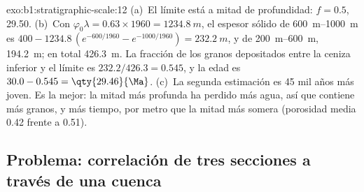 \begin{solution}{exo:b1:stratigraphic-scale:12}
(a)~El límite está a mitad de profundidad: $f = 0.5$, \qty{29.50}{\Ma}. (b)~Con
$\varphi_0\lambda = 0.63 \times 1960 = \qty{1234.8}{m}$, el espesor sólido de
\qtyrange{600}{1000}{m} es $400 - 1234.8\,(e^{-600/1960} - e^{-1000/1960}) =
\qty{232.2}{m}$, y de \qtyrange{200}{600}{m}, \qty{194.2}{m}; en total
\qty{426.3}{m}. La fracción de los granos depositados entre la ceniza inferior y el
límite es $232.2/426.3 = 0.545$, y la edad es $30.0 - 0.545 =
\qty{29.46}{\Ma}$. (c)~La segunda estimación es \num{45} mil años más joven.
Es la mejor: la mitad más profunda ha perdido más agua, así que contiene más granos, y más tiempo, por metro que la mitad más somera (porosidad media
\num{0.42} frente a \num{0.51}).
\end{solution}

\subsection*{Problema: correlación de tres secciones a través de una cuenca}

